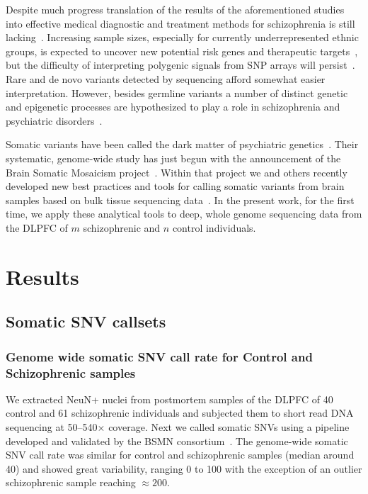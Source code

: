 \documentclass[letterpaper]{article}
\begin{document}
Despite much progress translation of the results of the aforementioned studies
into effective medical diagnostic and treatment methods for schizophrenia is
still lacking~\citep{Breen2016,Foley2017}. Increasing sample sizes, especially
for currently underrepresented ethnic groups, is expected to uncover new
potential risk genes and therapeutic targets~\citep{Visscher2017}, but the difficulty of interpreting
polygenic signals from SNP arrays will persist~\citep{Boyle2017}.  Rare and de
novo variants detected by sequencing afford somewhat easier interpretation.
However, besides germline variants a number of distinct genetic and epigenetic
processes are hypothesized to play a role in schizophrenia and psychiatric
disorders~\citep{PsychENCODEConsortium2015}.

Somatic variants have been called the dark matter of psychiatric
genetics~\citep{Insel2014}.  Their systematic, genome-wide study has just begun
with the announcement of the Brain Somatic Mosaicism
project~\citep{McConnell2017}.  Within that project we and others recently
developed new best practices and tools for calling somatic variants from brain
samples based on bulk tissue sequencing data~\citep{Wang2021}.  In the present
work, for the first time, we apply these analytical tools to deep, whole
genome sequencing data from the DLPFC of \(m\) schizophrenic and \(n\) control
individuals.

\section*{Results}

\subsection*{Somatic SNV callsets}

\subsubsection*{Genome wide somatic SNV call rate for Control and Schizophrenic samples}

We extracted NeuN+ nuclei from postmortem samples of the DLPFC of 40 control
and 61 schizophrenic individuals and subjected them to short read DNA
sequencing at 50--540\(\times\) coverage.  Next we called somatic SNVs using a
pipeline developed and validated by the BSMN consortium~\citep{Wang2021}.  The
genome-wide somatic SNV call rate was similar for control and schizophrenic
samples (median around 40) and showed great variability, ranging 0 to 100 with
the exception of an outlier schizophrenic sample reaching \(\approx 200\).
\end{document}
